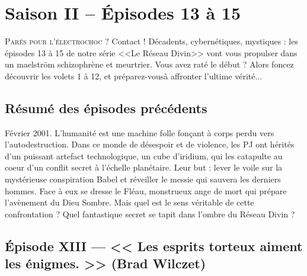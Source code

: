 \documentclass[11pt,twoside,a4paper]{book}
\begin{document}
\chapter*{Saison II -- {\'E}pisodes 13 {\`a} 15}

\lettrine{P}{ar{\'e}s pour l'{\'e}lectrochoc ?} Contact ! D{\'e}cadents, cybern{\'e}tiques, mystiques : les {\'e}pisodes 13 {\`a} 15 de notre s{\'e}rie <<Le R{\'e}seau Divin>> vont vous propulser dans un maelstr{\"o}m schizophr{\`e}ne et meurtrier. Vous avez rat{\'e} le d{\'e}but ? Alors foncez d{\'e}couvrir les volets 1 {\`a} 12, et pr{\'e}parez-vous{\`a} affronter l'ultime v{\'e}rit{\'e}... %

\section*{R{\'e}sum{\'e} des {\'e}pisodes pr{\'e}c{\'e}dents}

F{\'e}vrier 2001. L'humanit{\'e} est une machine folle fon\c{c}ant {\`a} corps perdu vers l'autodestruction.  Dans ce monde de d{\'e}sespoir et de violence, les PJ ont h{\'e}rit{\'e}s d'un puissant artefact technologique, un cube d'iridium, qui les catapulte au coeur d'un conflit secret {\`a} l'{\'e}chelle plan{\'e}taire. Leur but : lever le voile sur la myst{\'e}rieuse conspiration Babel et r{\'e}veiller le messie qui sauvera les derniers hommes. Face {\`a} eux se dresse le Fl{\'e}au, monstrueux ange de mort qui pr{\'e}pare l'av{\`e}nement du Dieu Sombre. Mais quel est le sens v{\'e}ritable de cette confrontation ? Quel fantastique secret se tapit dans l'ombre du R{\'e}seau Divin ? %

\section*{{\'E}pisode XIII --- << \textbf{Les esprits torteux aiment les {\'e}nigmes. } >> (Brad Wilczet)}
\end{document}
